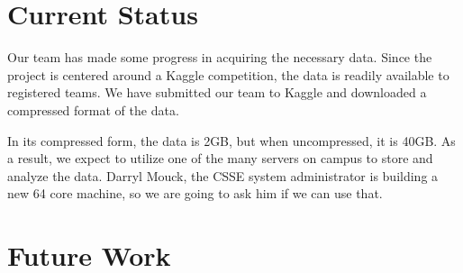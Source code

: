 \documentclass{memo}
\begin{document}
	
\maketitle

\section{Current Status}
Our team has made some progress in acquiring the necessary data. Since the project is centered around a Kaggle competition, the data is readily available to registered teams. We have submitted our team to Kaggle and downloaded a compressed format of the data.

In its compressed form, the data is 2GB, but when uncompressed, it is 40GB. As a result, we expect to utilize one of the many servers on campus to store and analyze the data. Darryl Mouck, the CSSE system administrator is building a new 64 core machine, so we are going to ask him if we can use that.

\section{Future Work}
\end{document}
